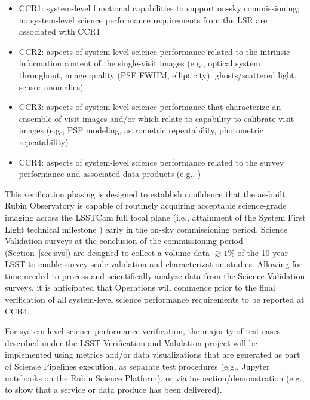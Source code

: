 \begin{itemize}
	\item CCR1: system-level functional capabilities to support on-sky commissioning; no system-level science performance requirements from the LSR are associated with CCR1
	\item CCR2: aspects of system-level science performance related to the intrinsic information content of the single-visit images (e.g., optical system throughout, image quality (PSF FWHM, ellipticity), ghosts/scattered light, sensor anomalies)
	\item CCR3: aspects of system-level science performance that characterize an ensemble of visit images and/or which relate to capability to calibrate visit images (e.g., PSF modeling, astrometric repeatability, photometric repeatability)
	\item CCR4: aspects of system-level science performance related to the survey performance and associated data products (e.g., )
\end{itemize}

This verification phasing is designed to establish confidence that the as-built Rubin Observatory is capable of routinely acquiring acceptable science-grade imaging across the LSSTCam full focal plane (i.e., attainment of the System First Light technical milestone ) early in the on-sky commissioning period.
Science Validation surveys at the conclusion of the commissioning period (Section~\ref{sec:svs}) are designed to collect a volume data $\gtrsim 1\%$ of the 10-year LSST to enable survey-scale validation and characterization studies.
Allowing for time needed to process and scientifically analyze data from the Science Validation surveys, it is anticipated that Operations will commence prior to the final verification of all system-level science performance requirements to be reported at CCR4.

For system-level science performance verification, the majority of test cases described under the LSST Verification and Validation project will be implemented using metrics and/or data visualizations that are generated as part of Science Pipelines execution, as separate test procedures (e.g., Jupyter notebooks on the Rubin Science Platform), or via inspection/demonstration (e.g., to show that a service or data produce has been delivered).

